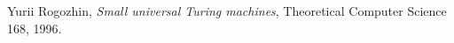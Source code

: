 \begin{thebibliography}{1}

	Yurii Rogozhin,
	\emph{Small universal Turing machines},
	Theoretical Computer Science 168,
	1996.

\end{thebibliography}
